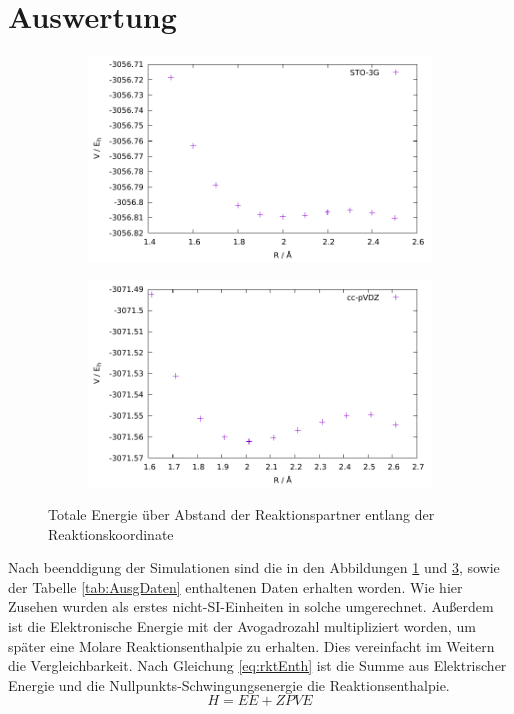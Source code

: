 \section{Auswertung}


\begin{figure}
	\centering
	\begin{subfigure}{0.49\linewidth}
		\includegraphics[width=\linewidth]{STO.pdf}
		\label{abb:STO}
	\end{subfigure}
	\hfill
	\begin{subfigure}{0.49\linewidth}
		\includegraphics[width=\linewidth]{cc.pdf}
 		\label{abb:cc}
	\end{subfigure}
	\caption{Totale Energie über Abstand der Reaktionspartner entlang der Reaktionskoordinate}
\end{figure}
Nach beenddigung der Simulationen sind die in den Abbildungen \ref{abb:STO} und \ref{abb:cc}, sowie der Tabelle \ref{tab:AusgDaten} enthaltenen Daten erhalten worden.
Wie hier Zusehen wurden als erstes nicht-SI-Einheiten in solche umgerechnet. 
Außerdem ist die Elektronische Energie mit der Avogadrozahl multipliziert worden, um später eine Molare Reaktionsenthalpie zu erhalten.
Dies vereinfacht im Weitern die Vergleichbarkeit.
Nach Gleichung \ref{eq:rktEnth} ist die Summe aus Elektrischer Energie und die Nullpunkts-Schwingungsenergie die Reaktionsenthalpie.
\begin{equation}
H=EE+ZPVE
\label{eq:rktEnth}
\end{equation}

